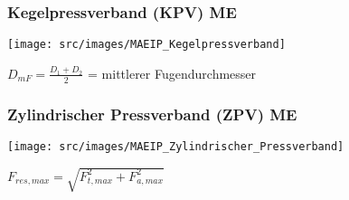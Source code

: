 \subsubsection{Kegelpressverband (KPV) \hfill ME}
\begin{footnotesize}
    \begin{minipage}{0.3\linewidth}
        \begin{center}
            \texttt{[image: src/images/MAEIP\_Kegelpressverband]}
        \end{center}
    \end{minipage}
    \begin{minipage}{0.58\linewidth}
        \begin{center}
            \scriptsize{$D_{mF} = \frac{D_1 + D_2}{2}$ = mittlerer Fugendurchmesser} 
            \vspace{-1mm}
        \end{center}
    \end{minipage}
\end{footnotesize}
\vspace{0.1em}

\subsubsection{Zylindrischer Pressverband (ZPV) \hfill ME}
\begin{footnotesize}
    \begin{minipage}{0.3\linewidth}
        \begin{center}
            \texttt{[image: src/images/MAEIP\_Zylindrischer\_Pressverband]}
        \end{center}
    \end{minipage}
    \begin{minipage}{0.58\linewidth}
        \begin{center}
            \scriptsize{$F_{res,max} = \sqrt{F_{t,max}^2 + F_{a,max}^2}$} 
        \end{center}
    \end{minipage}
\end{footnotesize}